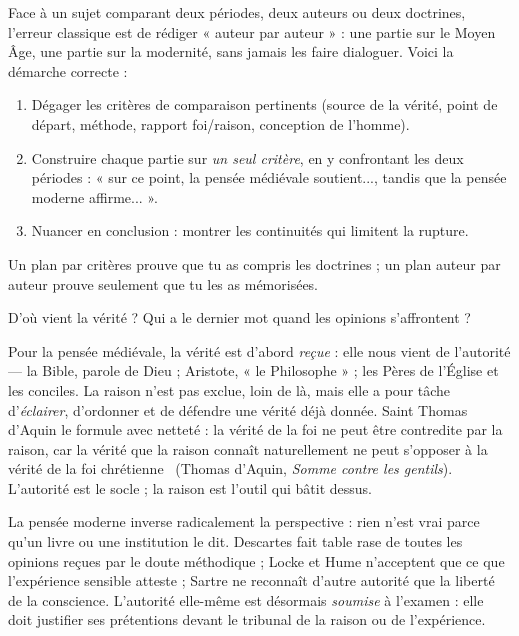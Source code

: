 \documentclass[11pt]{article}
\newcommand{\cle}[1]{{\popxbold\color{popdark}#1}}
\newcounter{popsec}
\newcounter{popsub}
\newcommand{\courssub}[1]{%
  \stepcounter{popsub}%
  \par\vspace{9pt}\noindent{\popxbold\fontsize{11.5}{13}\selectfont\color{popink}{\color{poporange}\thepopsec.\thepopsub}\hspace{6pt}#1}\par\nopagebreak\vspace{4pt}
}
\begin{document}
\begin{methode}
Face à un sujet comparant deux périodes, deux auteurs ou deux doctrines, l'erreur classique est de rédiger « auteur par auteur » : une partie sur le Moyen Âge, une partie sur la modernité, sans jamais les faire dialoguer. Voici la démarche correcte :
\begin{enumerate}
\item Dégager les \cle{critères} de comparaison pertinents (source de la vérité, point de départ, méthode, rapport foi/raison, conception de l'homme).
\item Construire chaque partie sur \emph{un seul critère}, en y confrontant les deux périodes : « sur ce point, la pensée médiévale soutient..., tandis que la pensée moderne affirme... ».
\item Nuancer en conclusion : montrer les continuités qui limitent la rupture.
\end{enumerate}
Un plan par critères prouve que tu as compris les doctrines ; un plan auteur par auteur prouve seulement que tu les as mémorisées.
\end{methode}

\courssub{Premier critère : la source de la vérité}

D'où vient la vérité ? Qui a le dernier mot quand les opinions s'affrontent ?

Pour la pensée médiévale, la vérité est d'abord \emph{reçue} : elle nous vient de l'\cle{autorité} — la Bible, parole de Dieu ; Aristote, « le Philosophe » ; les Pères de l'Église et les conciles. La raison n'est pas exclue, loin de là, mais elle a pour tâche d'\emph{éclairer}, d'ordonner et de défendre une vérité déjà donnée. Saint Thomas d'Aquin le formule avec netteté : la vérité de la foi ne peut être contredite par la raison, car \guillemotleft la vérité que la raison connaît naturellement ne peut s'opposer à la vérité de la foi chrétienne \guillemotright\ (Thomas d'Aquin, \emph{Somme contre les gentils}). L'autorité est le socle ; la raison est l'outil qui bâtit dessus.

La pensée moderne inverse radicalement la perspective : rien n'est vrai parce qu'un livre ou une institution le dit. Descartes fait table rase de toutes les opinions reçues par le doute méthodique ; Locke et Hume n'acceptent que ce que l'expérience sensible atteste ; Sartre ne reconnaît d'autre autorité que la liberté de la conscience. L'autorité elle-même est désormais \emph{soumise} à l'examen : elle doit justifier ses prétentions devant le tribunal de la raison ou de l'expérience.
\end{document}
